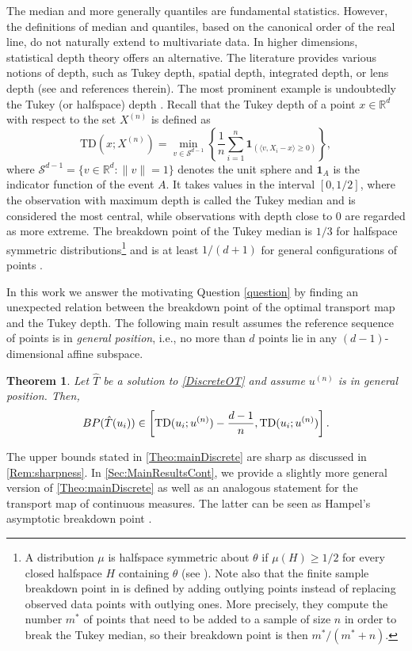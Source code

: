 \documentclass[11pt]{article}
\newcommand{\R}{\mathbb{R}}
\theoremstyle{plain}
\newtheorem{theorem}[sectioncount]{Theorem}
\theoremstyle{definition}
\begin{document}
The median and more generally quantiles are fundamental statistics. However, the definitions of  median and quantiles, based on the canonical order of the real line, do not naturally extend to multivariate data. In higher dimensions, statistical depth theory offers an alternative. The literature provides various notions of depth, such as Tukey depth, spatial depth, integrated depth, or lens depth (see \cite{Mosler.2013} and references therein). The most prominent example is undoubtedly the Tukey (or halfspace) depth \cite{Tukey.1975}.  Recall that the Tukey  depth of a point $x\in \R^d$  with respect to  the set $X^{(n)}$ is defined as 
%
\[
\mathrm{TD}(x; X^{(n)}) = \min_{v\in \mathcal{S}^{d-1}} \left\{ \frac{1}{n} \sum_{i=1}^{n} \mathbf{1}_{\left( \langle v, X_i - x \rangle \geq 0 \right)} \right\},
\]
%
where $\mathcal{S}^{d-1}=\{v {\in \R^d}: \|v\| = 1\}$ denotes the unit sphere and  $\mathbf{1}_A$ is the  indicator function of the event $A$. 
It takes values in the interval \([0,1/2]\), where the observation with maximum depth  is called the Tukey median and is considered the most central, while observations with depth close to $0$ are regarded as more extreme. The breakdown point of the Tukey median is \(1/3\) for halfspace symmetric distributions\footnote{ {A distribution $\mu$ is halfspace symmetric about $\theta$ if $\mu(H)\ge 1/2$ for every closed halfspace $H$ containing $\theta$   (see \cite[p.~464]{zuo:serfling2000}). Note also that the finite sample breakdown point in \cite{donoho:gasko1992} is defined by adding outlying points instead of replacing observed data points with outlying ones. More precisely, they compute the number  $m^*$ of points that  need to be added to a sample of size $n$  in order to break the Tukey median, so their breakdown point is then $m^*/(m^*+n)$.}  } and is at least $1/(d+1)$ for general configurations of points \cite{donoho:gasko1992}. 

In this work we answer the motivating Question \ref{question} by finding an unexpected relation between the breakdown point of the optimal transport map and the Tukey depth. The following main result assumes the reference sequence of points is in \emph{general position}, i.e., no more than $d$ points lie in any $(d-1)$-dimensional affine subspace. 
%
\begin{theorem}    \label{Theo:mainDiscrete}
    Let $\hat{T}$ be a solution to \eqref{DiscreteOT} and  assume $u^{(n)}$ is in general position. Then, 
    $${\rm BP}(\hat{T}(u_i))\in \left[\mathrm{TD}(u_i; u^{(n)})-\frac{d-1}{n},\mathrm{TD}(u_i;u^{(n)})\right].
$$
\end{theorem}
%
The upper bounds stated in \autoref{Theo:mainDiscrete} are sharp as discussed in \autoref{Rem:sharpness}. 
In \autoref{Sec:MainResultsCont}, we provide a slightly more general version of  {\autoref{Theo:mainDiscrete}} as well as an analogous statement for the transport map of continuous measures.  The latter can be seen as Hampel's asymptotic breakdown point \cite{hampel1971}.
%
\end{document}
